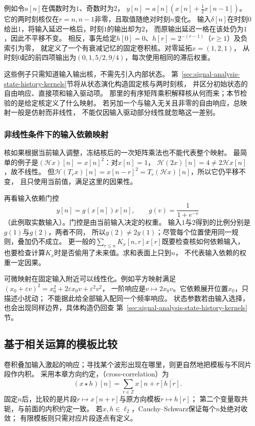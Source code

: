 例如令$a[n]$在偶数时为$1$、奇数时为$2$，
$y[n]=a[n](x[n]+\tfrac12x[n-1])$。
它的两时刻核仅在$r=n,n-1$非零，且取值随绝对时刻$n$变化。
输入$\delta[n]$在时刻$0$给出$1$，将输入延迟一格后，时刻$1$的输出却为$2$，
而原输出延迟一格在该处仍为$1$，因此不平移不变。
相反，事先给定$h[0]=0$、$h[r]=2^{-(r-1)}$（$r\geq1$）及负索引为零，
就定义了一个有衰减记忆的固定卷积核。对零延拓$x=(1,2,1)$，
从时刻$0$起的前四项输出为$(0,1,5/2,9/4)$，每次使用相同的滞后权重。

这些例子只需知道输入输出核，不需先引入内部状态。
第~\ref{sec:signal-analysis-state-history-kernels}节将从状态演化构造固定核与两时刻核，
并区分初始状态的自由响应、直接项和输入驱动项。
那里的有序矩阵乘积解释核从何而来；本节检验的是给定核定义了什么映射。
若另加一个与输入无关且非零的自由响应，总映射一般是仿射而非线性，
不能仅因输入驱动部分线性就忽略这一差别。

\subsubsection{非线性条件下的输入依赖映射}

核如果根据当前输入调整，冻结核后的一次矩阵乘法也不能代表整个映射。
最简单的例子是$(\mathcal Hx)[n]=x[n]^2$：对$x[n]=1$，
$\mathcal H(2x)[n]=4\neq2\mathcal Hx[n]$，故不线性。
但$\mathcal H(T_rx)[n]=x[n-r]^2=T_r(\mathcal Hx)[n]$，所以它仍平移不变，
且只使用当前值，满足这里的因果性。

再看输入依赖门控
\[
  y[n]=g(x[n])x[n],\qquad g(v)=\frac1{1+e^{-v}}
\]
（此例取实数输入）。门控是由当前输入决定的权重。
输入$1$与$2$得到的比例分别是$g(1)$与$g(2)$，两者不同，
所以$y(2)\neq2y(1)$；尽管每个位置使用同一规则，叠加仍不成立。
更一般的$\sum_{r\leq n}K_x[n,r]x[r]$既要检查核如何依赖输入，
也要检查计算$K_x$时是否偷用了未来值。求和表面上只到$n$，
不代表输入依赖的权重一定因果。

可微映射在固定输入附近可以线性化。例如平方映射满足
$(x_0+\varepsilon v)^2=x_0^2+2\varepsilon x_0v+\varepsilon^2v^2$，
一阶响应是$v\mapsto2x_0v$。它依赖展开位置$x_0$，只描述小扰动；
不能据此给全部输入配同一个频率响应。
状态参数若由输入选择，也会出现同样边界，具体构造仍回查
第~\ref{sec:signal-analysis-state-history-kernels}节。

\subsection{基于相关运算的模板比较}
\label{sec:signal-template-correlation}

卷积叠加输入激起的响应；寻找某个波形出现在哪里，则更自然地把模板与不同片段作内积。
采用本章方向约定，（cross-correlation）为
\begin{equation}
  (x\star h)[n]=\sum_{r\in\mathbb Z}x[n+r]\overline{h[r]}.
  \label{eq:signal-analysis-cross-correlation}
\end{equation}
固定$n$后，比较的是片段$r\mapsto x[n+r]$与原方向模板$r\mapsto h[r]$；
第二个变量取共轭，与前面的内积约定一致。
若$x,h\in\ell_2$，Cauchy--Schwarz保证每个$n$处绝对收敛；
有限模板则只需对应片段逐点有定义。

